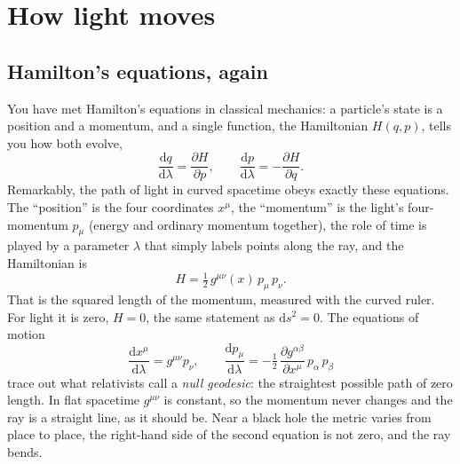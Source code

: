 \documentclass[11pt,a4paper]{article}
\newcommand{\dd}{\mathrm{d}}
\begin{document}
\section{How light moves}\label{sec:motion}

\subsection{Hamilton's equations, again}

You have met Hamilton's equations in classical mechanics: a particle's state is a position
and a momentum, and a single function, the Hamiltonian $H(q,p)$, tells you how both evolve,
\begin{equation}
  \frac{\dd q}{\dd\lambda} = \frac{\partial H}{\partial p}, \qquad
  \frac{\dd p}{\dd\lambda} = -\frac{\partial H}{\partial q} .
\end{equation}
Remarkably, the path of light in curved spacetime obeys exactly these equations. The
``position'' is the four coordinates $x^\mu$, the ``momentum'' is the light's four-momentum
$p_\mu$ (energy and ordinary momentum together), the role of time is played by a parameter
$\lambda$ that simply labels points along the ray, and the Hamiltonian is
\begin{equation}
  H = \tfrac12\, g^{\mu\nu}(x)\, p_\mu\, p_\nu .
  \label{eq:H}
\end{equation}
That is the squared length of the momentum, measured with the curved ruler. For light it is
zero, $H = 0$, the same statement as $\dd s^2 = 0$. The equations of motion
\begin{equation}
  \frac{\dd x^\mu}{\dd\lambda} = g^{\mu\nu} p_\nu, \qquad
  \frac{\dd p_\mu}{\dd\lambda} = -\tfrac12\, \frac{\partial g^{\alpha\beta}}{\partial x^\mu}\, p_\alpha\, p_\beta
  \label{eq:hamilton}
\end{equation}
trace out what relativists call a \emph{null geodesic}: the straightest possible path of
zero length. In flat spacetime $g^{\mu\nu}$ is constant, so the momentum never changes and
the ray is a straight line, as it should be. Near a black hole the metric varies from place
to place, the right-hand side of the second equation is not zero, and the ray bends.
\end{document}
